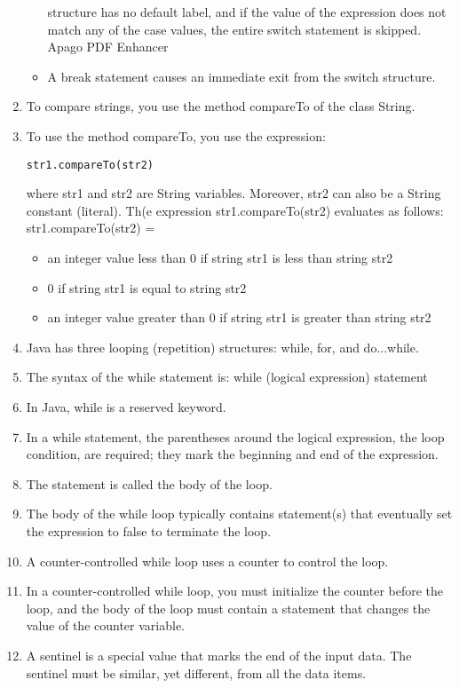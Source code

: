 \documentclass[12pt,a4paper,final,twoside,onecolumn,titlepage]{book}
\begin{document}
\begin{enumerate}
\begin{itemize}
structure has no default label, and if the value of the expression does
not match any of the case values, the entire switch statement is skipped. Apago PDF Enhancer
\item A break statement causes an immediate exit from the switch structure.
\end{itemize}
\item To compare strings, you use the method compareTo of the class String.
\item To use the method compareTo, you use the expression:
\begin{lstlisting}
str1.compareTo(str2)
\end{lstlisting}
where str1 and str2 are String variables. Moreover, str2 can also be a String constant (literal). Th(e expression str1.compareTo(str2) evaluates as follows:
str1.compareTo(str2) =
\begin{itemize}
\item an integer value less than 0 if string str1 is less than string str2
\item 0 if string str1 is equal to string str2
\item an integer value greater than 0 if string str1 is greater than string str2
\end{itemize}
\item Java has three looping (repetition) structures: while, for, and do...while.
\item The syntax of the while statement is: while (logical expression) statement
\item In Java, while is a reserved keyword.
\item In a while statement, the parentheses around the logical expression, the loop condition, are required; they mark the beginning and end of the expression.
\item The statement is called the body of the loop.
\item The body of the while loop typically contains statement(s) that eventually set the expression to false to terminate the loop.
\item A counter-controlled while loop uses a counter to control the loop.
\item In a counter-controlled while loop, you must initialize the counter before the loop, and the body of the loop must contain a statement that changes the value of the counter variable.
\item A sentinel is a special value that marks the end of the input data. The sentinel must be similar, yet different, from all the data items.

\end{enumerate}
\end{document}
